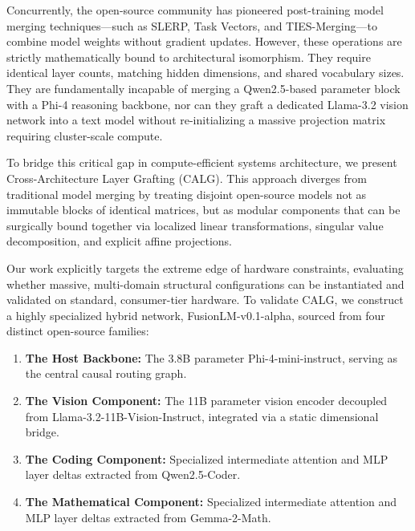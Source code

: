 \documentclass[11pt]{article}
\begin{document}
Concurrently, the open-source community has pioneered post-training model merging techniques—such as SLERP, Task Vectors, and TIES-Merging—to combine model weights without gradient updates. However, these operations are strictly mathematically bound to architectural isomorphism. They require identical layer counts, matching hidden dimensions, and shared vocabulary sizes. They are fundamentally incapable of merging a Qwen2.5-based parameter block with a Phi-4 reasoning backbone, nor can they graft a dedicated Llama-3.2 vision network into a text model without re-initializing a massive projection matrix requiring cluster-scale compute.

To bridge this critical gap in compute-efficient systems architecture, we present Cross-Architecture Layer Grafting (CALG). This approach diverges from traditional model merging by treating disjoint open-source models not as immutable blocks of identical matrices, but as modular components that can be surgically bound together via localized linear transformations, singular value decomposition, and explicit affine projections.

Our work explicitly targets the extreme edge of hardware constraints, evaluating whether massive, multi-domain structural configurations can be instantiated and validated on standard, consumer-tier hardware. To validate CALG, we construct a highly specialized hybrid network, FusionLM-v0.1-alpha, sourced from four distinct open-source families:
\begin{enumerate}
    \item \textbf{The Host Backbone:} The 3.8B parameter Phi-4-mini-instruct, serving as the central causal routing graph.
    \item \textbf{The Vision Component:} The 11B parameter vision encoder decoupled from Llama-3.2-11B-Vision-Instruct, integrated via a static dimensional bridge.
    \item \textbf{The Coding Component:} Specialized intermediate attention and MLP layer deltas extracted from Qwen2.5-Coder.
    \item \textbf{The Mathematical Component:} Specialized intermediate attention and MLP layer deltas extracted from Gemma-2-Math.
\end{enumerate}
\end{document}
